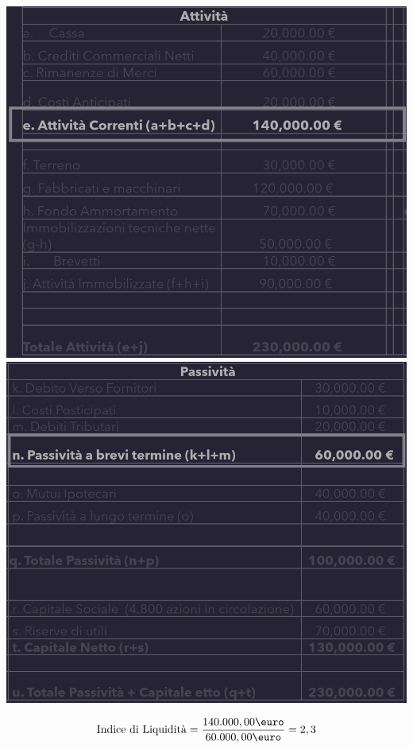 \documentclass{article}
\begin{document}
\begin{center}
    \includegraphics[scale=0.3]{Image/IndiceLiq_1.png}
    \includegraphics[scale=0.3]{Image/IndiceLiq_2.png}
\end{center}
\[
    \T{Indice di Liquidità} = \frac{140.000,00\T{\euro}}{60.000,00\T{\euro}} = 2,3
\]
\end{document}
